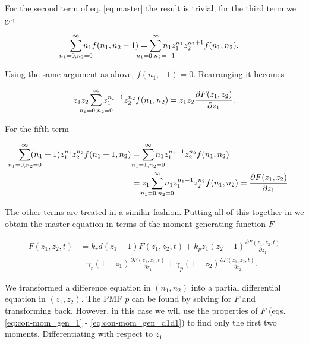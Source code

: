 For the second term of eq. \eqref{eq:master} the result is trivial, for the third term we get

\begin{equation*}
  \sum_{\mathclap{n_1=0,n_2=0}}^\infty n_1f(n_1,n_2-1) = \sum_{\mathclap{n_1=0,n_2=-1}}^\infty n_1z_1^{n_1}z_2^{n_2+1}f(n_1,n_2).
\end{equation*}

Using the same argument as above, $f(n_1,-1) = 0$. Rearranging it becomes

\begin{equation*}
  z_1 z_2 \sum_{\mathclap{n_1=0,n_2=0}}^\infty z_1^{n_1-1}z_2^{n_2}f(n_1,n_2) = z_1 z_2 \frac{\partial F(z_1,z_2)}{\partial z_1}.
\end{equation*}

For the fifth term

\begin{equation*}
  \begin{split}
    \sum_{\mathclap{n_1=0,n_2=0}}^\infty (n_1+1)z_1^{n_1}z_2^{n_2}f(n_1+1,n_2) &= \sum_{\mathclap{n_1=1,n_2=0}}^\infty n_1z_1^{n_1-1}z_2^{n_2}f(n_1,n_2)\\ 
    &= z_1 \sum_{\mathclap{n_1=0,n_2=0}}^\infty n_1z_1^{n_1-1}z_2^{n_2}f(n_1,n_2) = \frac{\partial F(z_1,z_2)}{\partial z_1}.
  \end{split}
\end{equation*}

The other terms are treated in a similar fashion. Putting all of this together in we obtain the master equation in terms of the moment generating function $F$

\begin{equation}
  \label{eq:masterF}
  \begin{split}
    \dot{F}(z_1,z_2,t) &= k_rd(z_1-1)F(z_1,z_2,t) + k_pz_1(z_2-1)\frac{\partial F(z_1,z_2,t)}{\partial z_1} \\
    &+ \gamma_r(1-z_1)\frac{\partial F(z_1,z_2,t)}{\partial z_1} + \gamma_p(1-z_2)\frac{\partial F(z_1,z_2,t)}{\partial z_2}.
  \end{split}
\end{equation}

We transformed a difference equation in $(n_1,n_2)$ into a partial differential equation in $(z_1,z_2)$. The PMF $p$ can be found by solving for $F$ and transforming back. However, in this case we will use the properties of $F$ (eqs. \eqref{eq:con-mom_gen_1} - \eqref{eq:con-mom_gen_d1d1}) to find only the first two moments. Differentiating with respect to $z_1$

